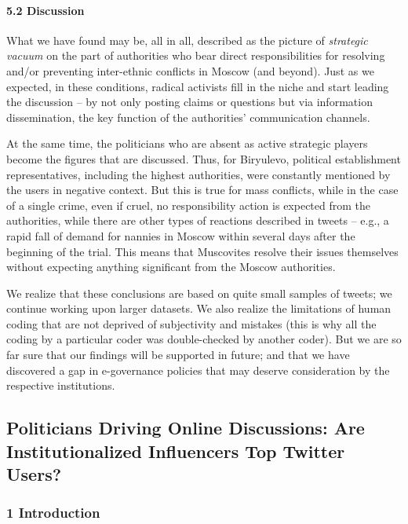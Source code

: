 \paragraph{5.2 Discussion}
What we have found may be, all in all, described as the picture of \textit{strategic vacuum} on the part of authorities who bear direct responsibilities for resolving and/or preventing inter-ethnic conflicts in Moscow (and beyond). Just as we expected, in these conditions, radical activists fill in the niche and start leading the discussion -- by not only posting claims or questions but via information dissemination, the key function of the authorities’ communication channels.

At the same time, the politicians who are absent as active strategic players become the figures that are discussed. Thus, for Biryulevo, political establishment representatives, including the highest authorities, were constantly mentioned by the users in negative context. But this is true for mass conflicts, while in the case of a single crime, even if cruel, no responsibility action is expected from the authorities, while there are other types of reactions described in tweets -- e.g., a rapid fall of demand for nannies in Moscow within several days after the beginning of the trial. This means that Muscovites resolve their issues themselves without expecting anything significant from the Moscow authorities.

We realize that these conclusions are based on quite small samples of tweets; we continue working upon larger datasets. We also realize the limitations of human coding that are not deprived of subjectivity and mistakes (this is why all the coding by a particular coder was double-checked by another coder). But we are so far sure that our findings will be supported in future; and that we have discovered a gap in e-governance policies that may deserve consideration by the respective institutions.

\subsection{Politicians Driving Online Discussions: Are Institutionalized Influencers Top Twitter Users?}\label{subsec:ch2/sec5/sub5}

\subsubsection{1 Introduction}

